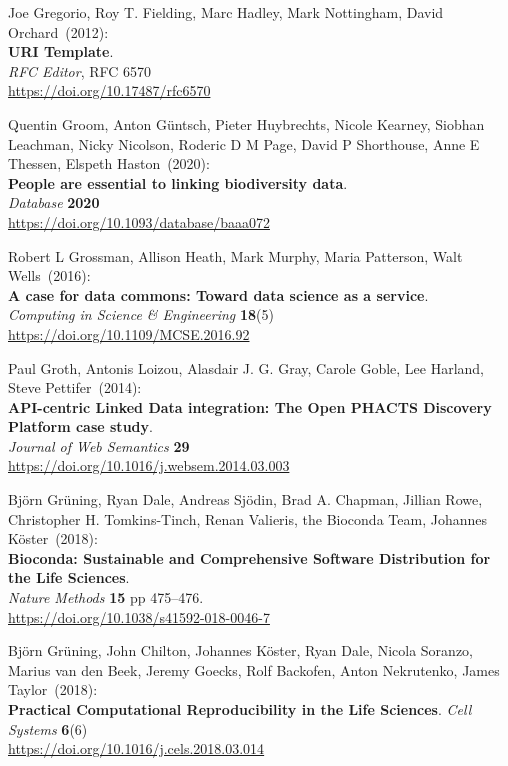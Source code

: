 \begin{thebibliography}{9}
Joe Gregorio, Roy T. Fielding, Marc Hadley, Mark Nottingham, David Orchard~(2012): \\
\textbf{{URI Template}}.\\
\emph{RFC Editor}, RFC 6570 \\
\url{https://doi.org/10.17487/rfc6570}

Quentin Groom, Anton Güntsch, Pieter Huybrechts, Nicole Kearney, Siobhan Leachman, Nicky Nicolson, Roderic D M Page, David P Shorthouse, Anne E Thessen, Elspeth Haston~(2020): \\
\textbf{People are essential to linking biodiversity data}.\\
\emph{Database} \textbf{2020}\\
\url{https://doi.org/10.1093/database/baaa072}

Robert L Grossman, Allison Heath, Mark Murphy, Maria Patterson,
Walt Wells~(2016): \\
\textbf{A case for data commons: Toward data science as a service}.\\
\emph{Computing in Science \& Engineering} \textbf{18}(5) \\
\url{https://doi.org/10.1109/MCSE.2016.92}

Paul Groth, Antonis Loizou, Alasdair J. G. Gray, Carole Goble, Lee
Harland, Steve Pettifer~(2014): \\
\textbf{API-centric Linked Data integration: {The Open PHACTS Discovery Platform} case study}.\\
\emph{Journal of Web Semantics} \textbf{29} \\
\url{https://doi.org/10.1016/j.websem.2014.03.003}

Björn Grüning, Ryan Dale, Andreas Sjödin, Brad A. Chapman,
Jillian Rowe, Christopher H. Tomkins-Tinch, Renan Valieris, the Bioconda
Team, Johannes Köster~(2018): \\
\textbf{Bioconda: Sustainable and Comprehensive Software Distribution
for the Life Sciences}.\\
\emph{Nature Methods} \textbf{15} pp 475--476.\\
\url{https://doi.org/10.1038/s41592-018-0046-7}

Björn Grüning, John Chilton, Johannes Köster, Ryan Dale, Nicola
Soranzo, Marius van den Beek, Jeremy Goecks, Rolf Backofen, Anton
Nekrutenko, James Taylor~(2018): \\
\textbf{Practical Computational Reproducibility in the Life Sciences}.
\emph{Cell Systems} \textbf{6}(6)\\
\url{https://doi.org/10.1016/j.cels.2018.03.014}


\end{thebibliography}
